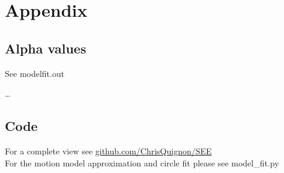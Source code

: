 \documentclass{scrartcl}
\begin{document}
\section{Appendix}
\subsection{Alpha values}
See modelfit.out

\dots





\subsection{Code}
For a complete view see \href{https://github.com/ChrisQuignon/SEE/tree/master/Homework04}{github.com/ChrisQuignon/SEE}\\
%
For the motion model approximation and circle fit please see model\_fit.py \\











%


\end{document}
